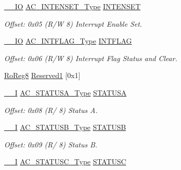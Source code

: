 \begin{DoxyCompactItemize}
\mbox{\hyperlink{core__cm0plus_8h_aec43007d9998a0a0e01faede4133d6be}{\+\_\+\+\_\+\+IO}} \mbox{\hyperlink{union_a_c___i_n_t_e_n_s_e_t___type}{A\+C\+\_\+\+I\+N\+T\+E\+N\+S\+E\+T\+\_\+\+Type}} \mbox{\hyperlink{struct_ac_af5a18bdc138524da112c6bb4eb555cc0}{I\+N\+T\+E\+N\+S\+ET}}
\begin{DoxyCompactList}\small\item\em Offset\+: 0x05 (R/W 8) Interrupt Enable Set. \end{DoxyCompactList}\item 
\mbox{\hyperlink{core__cm0plus_8h_aec43007d9998a0a0e01faede4133d6be}{\+\_\+\+\_\+\+IO}} \mbox{\hyperlink{union_a_c___i_n_t_f_l_a_g___type}{A\+C\+\_\+\+I\+N\+T\+F\+L\+A\+G\+\_\+\+Type}} \mbox{\hyperlink{struct_ac_a9e9530621ea55d1c50564568ea2938c5}{I\+N\+T\+F\+L\+AG}}
\begin{DoxyCompactList}\small\item\em Offset\+: 0x06 (R/W 8) Interrupt Flag Status and Clear. \end{DoxyCompactList}\item 
\mbox{\hyperlink{group___s_a_m_d21_e15_a__definitions_ga0d957f1433aaf5d70e4dc2b68288442d}{Ro\+Reg8}} \mbox{\hyperlink{struct_ac_a092866123ac46d0985136e4dca2f36f4}{Reserved1}} \mbox{[}0x1\mbox{]}
\item 
\mbox{\hyperlink{core__cm0plus_8h_af63697ed9952cc71e1225efe205f6cd3}{\+\_\+\+\_\+I}} \mbox{\hyperlink{union_a_c___s_t_a_t_u_s_a___type}{A\+C\+\_\+\+S\+T\+A\+T\+U\+S\+A\+\_\+\+Type}} \mbox{\hyperlink{struct_ac_a683e6f8c7abf8ee788efebe284dcd4f5}{S\+T\+A\+T\+U\+SA}}
\begin{DoxyCompactList}\small\item\em Offset\+: 0x08 (R/ 8) Status A. \end{DoxyCompactList}\item 
\mbox{\hyperlink{core__cm0plus_8h_af63697ed9952cc71e1225efe205f6cd3}{\+\_\+\+\_\+I}} \mbox{\hyperlink{union_a_c___s_t_a_t_u_s_b___type}{A\+C\+\_\+\+S\+T\+A\+T\+U\+S\+B\+\_\+\+Type}} \mbox{\hyperlink{struct_ac_a7afadd7a93198cb9d6037d382b5c2919}{S\+T\+A\+T\+U\+SB}}
\begin{DoxyCompactList}\small\item\em Offset\+: 0x09 (R/ 8) Status B. \end{DoxyCompactList}\item 
\mbox{\hyperlink{core__cm0plus_8h_af63697ed9952cc71e1225efe205f6cd3}{\+\_\+\+\_\+I}} \mbox{\hyperlink{union_a_c___s_t_a_t_u_s_c___type}{A\+C\+\_\+\+S\+T\+A\+T\+U\+S\+C\+\_\+\+Type}} \mbox{\hyperlink{struct_ac_ae4f60049760c33c166824b882e209873}{S\+T\+A\+T\+U\+SC}}

\end{DoxyCompactItemize}

